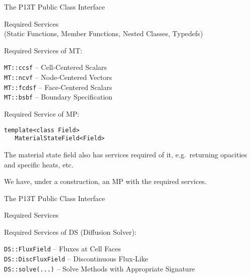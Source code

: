 \documentclass{myslidehead}
\begin{document}

\begin{slide}

  \begin{center}
    \large The P13T Public Class Interface
  \end{center}

  \begin{center}
    Required Services \\
    (Static Functions, Member Functions, Nested Classes, Typedefs)
  \end{center}

  Required Services of MT:

    \verb#MT::ccsf# -- Cell-Centered Scalars \\
    \verb#MT::ncvf#  -- Node-Centered Vectors \normalcolor \\
    \verb#MT::fcdsf#  -- Face-Centered Scalars \\
    \verb#MT::bsbf# -- Boundary Specification

  Required Service of MP:

  \verb#template<class Field># \\
  \verb#   MaterialStateField<Field>#

\end{slide}


\begin{note}

  The material state field also has services required of it,
  e.g.\ returning opacities and specific heats, etc.

  We have, under a construction, an MP with the required services.

\end{note}


\begin{slide}

  \begin{center}
    \large The P13T Public Class Interface
  \end{center}

  \begin{center}
    Required Services
  \end{center}

  Required Services of DS (Diffusion Solver):

  \verb#DS::FluxField# -- Fluxes at Cell Faces \\
  \verb#DS::DiscFluxField# -- Discontinuous Flux-Like \\
  \verb#DS::solve(...)# -- Solve Methods with Appropriate Signature 

\end{slide}
\end{document}
